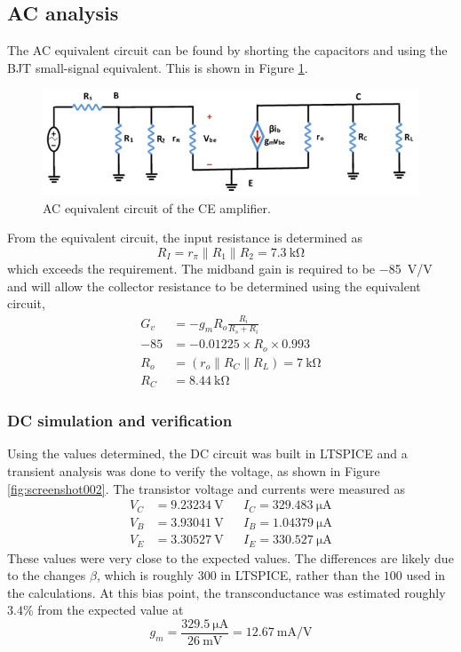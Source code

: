 \documentclass{homework}
\begin{document}
	\subsection*{AC analysis}
	The AC equivalent circuit can be found by shorting the capacitors and using the BJT small-signal equivalent. This is shown in Figure \ref{fig:screenshot001}.
	\begin{figure}[H]
		\centering
		\includegraphics[width=0.7\linewidth]{screenshot001}
		\caption{AC equivalent circuit of the CE amplifier.}
		\label{fig:screenshot001}
	\end{figure}
	\noindent From the equivalent circuit, the input resistance is determined as 
	\[ R_I = r_\pi \parallel R_1 \parallel R_2 = \SI{7.3}{\kohm}\]
	which exceeds the requirement. The midband gain is required to be \SI{-85}{\V/\V} and will allow the collector resistance to be determined using the equivalent circuit, \begin{align*}
		G_v & = -g_m R_o \frac{R_i}{R_s + R_i}\\
		-85 & =  -0.01225 \times R_o \times 0.993 \\
		R_o & = \left(r_o \parallel R_C \parallel R_L \right) = \SI{7}{\kohm} \\
		R_C & = \SI{8.44}{\kohm}
	\end{align*}

	\subsubsection*{DC simulation and verification}
	Using the values determined, the DC circuit was built in LTSPICE and a transient analysis was done to verify the voltage, as shown in Figure \ref{fig:screenshot002}. The transistor voltage and currents were measured as \begin{align*}
		V_C & = \SI{9.23234}{\V} && I_C = \SI{329.483}{\micro\ampere} \\
		V_B & = \SI{3.93041}{\V} && I_B = \SI{1.04379}{\micro\ampere} \\
		V_E & = \SI{3.30527}{\V} && I_E = \SI{330.527}{\micro\ampere}
	\end{align*}
	These values were very close to the expected values. The differences are likely due to the changes $\beta$, which is roughly $300$ in LTSPICE, rather than the $100$ used in the calculations. At this bias point, the transconductance was estimated roughly $3.4\%$ from the expected value at
		\[ g_m = \frac{\SI{329.5}{\uA}}{\SI{26}{\mV}} = \SI{12.67}{\mA/\V} \]
	
\end{document}
